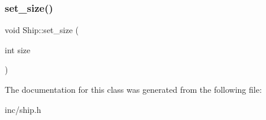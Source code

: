 \subsubsection{\texorpdfstring{set\_size()}{set\_size()}}
{\footnotesize\ttfamily void Ship\+::set\+\_\+size (\begin{DoxyParamCaption}\item[{int}]{size }\end{DoxyParamCaption})}



The documentation for this class was generated from the following file\+:\begin{DoxyCompactItemize}
\item 
inc/ship.\+h\end{DoxyCompactItemize}
